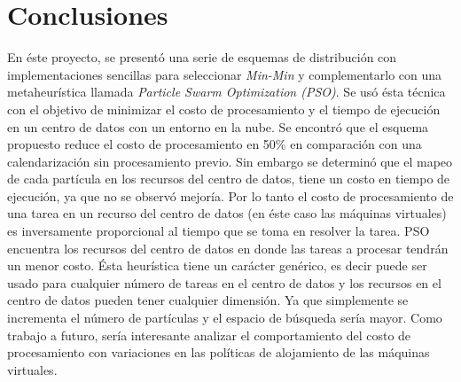 \chead{}
\rhead{\thepage}

\chapter*{Conclusiones}

En éste proyecto, se presentó una serie de esquemas de distribución con implementaciones sencillas para seleccionar \textit{Min-Min} y complementarlo con una metaheurística  llamada \textit{Particle Swarm Optimization (PSO)}. Se usó ésta técnica con el objetivo de minimizar el costo de procesamiento y el tiempo de ejecución en un centro de datos con un entorno en la nube. Se encontró que el esquema propuesto reduce el costo de procesamiento en 50\% en comparación con una calendarización sin procesamiento previo. Sin embargo se determinó que el mapeo de cada partícula en los recursos del centro de datos, tiene un costo en tiempo de ejecución, ya que no se observó mejoría. Por lo tanto el costo de procesamiento de una tarea en un recurso del centro de datos (en éste caso las máquinas virtuales) es inversamente proporcional al tiempo que se toma en resolver la tarea.
PSO encuentra los recursos del centro de datos en donde las tareas a procesar tendrán un menor costo. Ésta heurística tiene un carácter genérico, es decir puede ser usado para cualquier número de tareas en el centro de datos y los recursos en el centro de datos pueden tener cualquier dimensión. Ya que simplemente se incrementa el número de partículas y el espacio de búsqueda sería mayor.
Como trabajo a futuro, sería interesante analizar el comportamiento del costo de procesamiento con variaciones en las políticas de alojamiento de las máquinas virtuales.



